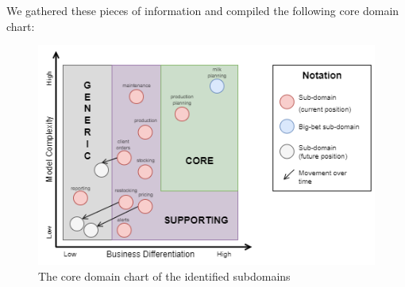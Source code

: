 We gathered these pieces of information and compiled the following core domain chart:

\begin{figure}[H]
    \centering
    \includegraphics[width=\textwidth]{img/core-domain-chart.png}
    \caption{The core domain chart of the identified subdomains}
    \label{img:core-domain-chart}
\end{figure}

